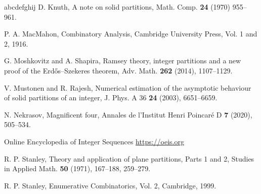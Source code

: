 \documentclass[12pt]{amsart}
\theoremstyle{definition}
\theoremstyle{remark}
\begin{document}
\begin{thebibliography}{abcdefghij}
D. Knuth, A note on solid partitions,  Math. Comp. {\bf 24} (1970) 955--961.

P. A. MacMahon, Combinatory Analysis, Cambridge University Press, Vol. 1 and 2, 1916.

G. Moshkovitz and A. Shapira, Ramsey theory, integer partitions and a new proof of the Erd\H{o}s–Szekeres theorem, Adv. Math. {\bf 262} (2014), 1107--1129.

V. Mustonen and R. Rajesh, Numerical estimation of the asymptotic behaviour of solid partitions of an integer, J. Phys. A 36 {\bf 24} (2003), 6651--6659.

N. Nekrasov, Magnificent four, Annales de l’Institut Henri Poincar\'e D {\bf 7} (2020), 505--534.

Online Encyclopedia of Integer Sequences \url{https://oeis.org}

R. P. Stanley, Theory and application of plane partitions, Parts 1 and 2, Studies in Applied Math. {\bf 50} (1971), 167--188, 259--279.

R. P. Stanley, Enumerative Combinatorics, Vol. 2, Cambridge, 1999.

\end{thebibliography}
\end{document}
